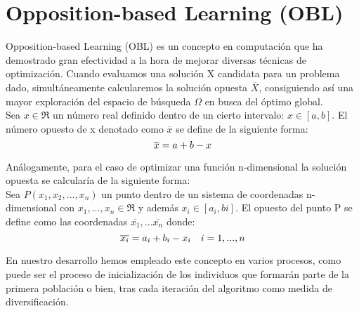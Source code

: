 

\section{Opposition-based Learning (OBL)}
\label{sec:OBL}

Opposition-based Learning (OBL)\cite{obl, obl2, OPSO, OPSO2, OPSO3} es un concepto en computación que ha demostrado gran efectividad a la hora de mejorar diversas técnicas de optimización. Cuando evaluamos una solución X candidata para un problema dado, simultáneamente  
 calcularemos la solución opuesta $\overline{X}$, consiguiendo así una mayor exploración del espacio de búsqueda $\Omega$ en busca del óptimo global. \cite{obl}\\

Sea $x \in \Re $  un número real definido dentro de un cierto intervalo: $x \in [a,b]$. El número opuesto de x denotado como $\overline{x}$ se define de la siguiente forma\cite{obl}: \\
 \begin{equation}
     \overline{x} = a + b - x  \\
 \end{equation}

Análogamente, para el caso de optimizar una función n-dimensional la solución opuesta se calcularía de la siguiente forma: \\

 Sea $ P(x_{1}, x_{2},...,x_{n}) $ un punto dentro de un sistema de coordenadas n-dimensional con $ x_{1},...,x_{n} \in \Re$ y además $ x_{i} \in [a_{i}, b{i}]$. \cite{obl} El opuesto del punto P se define como las coordenadas $\overline{x_{1}},...\overline{x_{n}}$ donde:\\
\begin{equation}
    \overline{x_{i}} = a_{i} + b_{i} - x_{i} \quad i = 1,...,n \\
\end{equation}

En nuestro desarrollo hemos empleado este concepto en varios procesos, como puede ser el proceso de inicialización de los individuos que formarán parte de la primera población o bien, tras cada iteración del algoritmo como medida de diversificación. 

